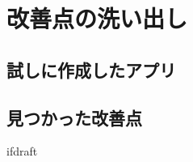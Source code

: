 \documentclass{jsarticle}
\begin{document}
    \fi
    \section{改善点の洗い出し}
    \subsection{試しに作成したアプリ}
    \subsection{見つかった改善点}


%
%
%
%
%



    \expandafter\ifx\csname ifdraft\endcsname\relax
\end{document}
